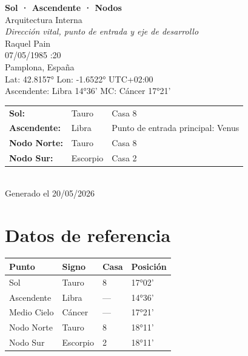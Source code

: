\documentclass[11pt,a4paper]{article}
\begin{document}
\begin{titlepage}
  \centering
  \vspace*{1.5cm}
  {\Huge\bfseries\color{azulai} Sol · Ascendente · Nodos}\\[0.5cm]
  {\large\color{grisai} Arquitectura Interna}\\[0.3cm]
  {\small\itshape\color{grisai} Dirección vital, punto de entrada y eje de desarrollo}\\[2cm]
  {\huge\color{doradoai} Raquel Pain}\\[1.5cm]
  {\Large 07/05/1985 :20}\\[0.3cm]
  {\Large Pamplona, España}\\[0.3cm]
  {\normalsize Lat: 42.8157° \quad Lon: -1.6522° \quad UTC+02:00}\\[0.3cm]
  {\normalsize Ascendente: Libra 14°36' \quad
    MC: Cáncer 17°21'}\\[2cm]
  \begin{tabular}{lll}
    \textbf{Sol:} & Tauro & Casa 8 \\
    \textbf{Ascendente:} & Libra & Punto de entrada principal: Venus \\
    \textbf{Nodo Norte:} & Tauro & Casa 8 \\
    \textbf{Nodo Sur:}   & Escorpio & Casa 2 \\
  \end{tabular}\\[2cm]
  \vfill
  {\small Generado el 20/05/2026}
\end{titlepage}

\tableofcontents
\newpage

\section{Datos de referencia}

\begin{center}
\begin{tabular}{llll}
  \toprule
  \textbf{Punto} & \textbf{Signo} & \textbf{Casa} & \textbf{Posición} \\
  \midrule
  Sol           & Tauro & 8 & 17°02' \\
  Ascendente    & Libra & --- & 14°36' \\
  Medio Cielo   & Cáncer & --- & 17°21' \\
  Nodo Norte    & Tauro & 8 & 18°11' \\
  Nodo Sur      & Escorpio & 2 & 18°11' \\
  \bottomrule
\end{tabular}
\end{center}
\end{document}
